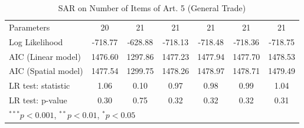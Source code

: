 \begin{table}[!h]
\begin{center}
\begin{tabular}{l c c c c c c }
Parameters              & 20           & 21           & 21           & 21           & 21           & 21           \\
Log Likelihood          & -718.77      & -628.88      & -718.13      & -718.48      & -718.36      & -718.75      \\
AIC (Linear model)      & 1476.60      & 1297.86      & 1477.23      & 1477.94      & 1477.70      & 1478.53      \\
AIC (Spatial model)     & 1477.54      & 1299.75      & 1478.26      & 1478.97      & 1478.71      & 1479.49      \\
LR test: statistic      & 1.06         & 0.10         & 0.97         & 0.98         & 0.99         & 1.04         \\
LR test: p-value        & 0.30         & 0.75         & 0.32         & 0.32         & 0.32         & 0.31         \\
\bottomrule
\multicolumn{7}{l}{\scriptsize{$^{***}p<0.001$, $^{**}p<0.01$, $^*p<0.05$}}
\end{tabular}
\caption{SAR on Number of Items of Art. 5 (General Trade)}
\label{table:coefficients}
\end{center}
\end{table}

